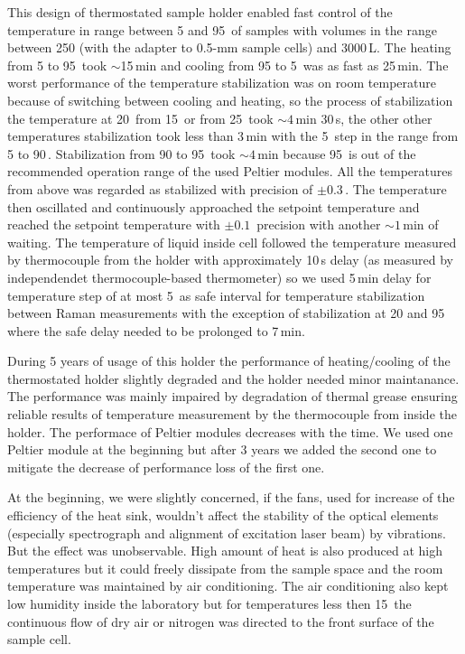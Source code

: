This design of thermostated sample holder enabled fast control of the
temperature in range between 5 and 95\,\textcelsius{} of samples with volumes
in the range between 250 (with the adapter to 0.5-mm sample cells) and
3000\,L. The heating from 5 to 95\,\textcelsius{} took $\sim$15\,min and
cooling from 95 to 5\,\textcelsius{} was as fast as 25\,min. The worst
performance of the temperature stabilization was on room temperature because of
switching between cooling and heating, so the process of stabilization the
temperature at 20\,\textcelsius{} from 15\,\textcelsius{} or from
25\,\textcelsius{} took $\sim 4$\,min 30\,s, the other other temperatures
stabilization took less than 3\,min with the 5\,\textcelsius{} step in the
range from 5 to 90\,\textcelsius{}. Stabilization from 90 to 95\,\textcelsius{}
took $\sim 4$\,min because 95\,\textcelsius{} is out of the recommended
operation range of the used Peltier modules. All the temperatures from above
was regarded as stabilized with precision of $\pm 0.3$\,\textcelsius{}. The
temperature then oscillated and continuously approached the setpoint
temperature and reached the setpoint temperature with $\pm 0.1$\,\textcelsius{}
precision with another $\sim 1$\,min of waiting. The temperature of liquid
inside cell followed the temperature measured by thermocouple from the holder
with approximately 10\,s delay (as measured by independendet thermocouple-based
thermometer) so we used 5\,min delay for temperature step of at most
5\,\textcelsius{} as safe interval for temperature stabilization between
Raman measurements with the exception of stabilization at 20 and
95\,\textcelsius{} where the safe delay needed to be prolonged to 7\,min.

During 5 years of usage of this holder the performance of heating/cooling of
the thermostated holder slightly degraded and the holder needed minor
maintanance. The performance was mainly impaired by degradation of thermal
grease ensuring reliable results of temperature measurement by the thermocouple
from inside the holder. The performace of Peltier modules decreases with the
time. We used one Peltier module at the beginning but after 3 years we added
the second one to mitigate the decrease of performance loss of the first one.

At the beginning, we were slightly concerned, if the fans, used for increase of
the efficiency of the heat sink, wouldn't affect the stability of the optical
elements (especially spectrograph and alignment of excitation laser beam) by
vibrations. But the effect was unobservable. High amount of heat is also
produced at high temperatures but it could freely dissipate from the sample
space and the room temperature was maintained by air conditioning. The air
conditioning also kept low humidity inside the laboratory but for temperatures
less then 15\,\textcelsius{} the continuous flow of dry air or nitrogen was
directed to the front surface of the sample cell.
